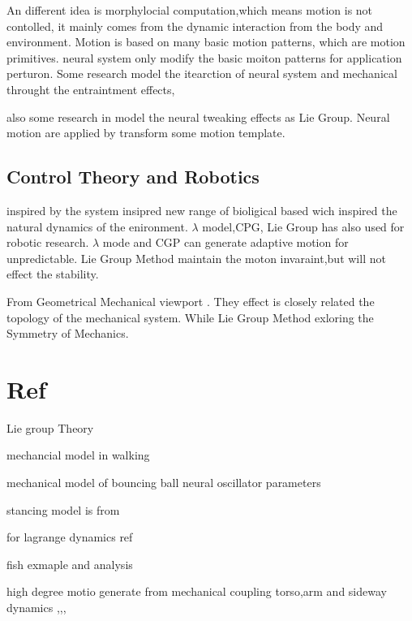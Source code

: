 An different idea is morphylocial computation\cite{nishikawa2007neuromechanics},which means motion is not contolled, it mainly comes from the dynamic interaction from the body and environment.
Motion is based on many basic motion patterns, which are motion primitives. neural system only modify the basic moiton patterns for application perturon.
Some research model the itearction of neural system and mechanical throught the entraintment effects\cite{Cohen1988}, 

also some research in model the neural tweaking effects as Lie Group.
Neural motion are applied by transform some motion template\cite{flash2007affine}.



\subsection{Control Theory and Robotics}


inspired by the system insipred new range of bioligical based wich inspired the natural dynamics of the enironment.
$\lambda$ model\cite{taga1991self},CPG\cite{Williamson1999}, 
Lie Group \cite{spong2005controlled} has also used for robotic research.
$\lambda$  mode and CGP can generate  adaptive motion for unpredictable.
Lie Group Method maintain the moton invaraint,but will not effect the stability.

From Geometrical Mechanical\cite{abraham1978foundations} viewport . 
They effect is closely related the topology of the mechanical system.
While Lie Group Method exloring the Symmetry of Mechanics\cite{marsden1999introduction}.





\section{Ref}
Lie group Theory \cite{olver1986applications}

mechancial model in walking \cite{chen2007passive}

mechanical model of bouncing ball
neural oscillator parameters 

stancing model is from\cite{stephens2009modeling}

for lagrange dynamics ref \cite{Goldstein2002}


fish exmaple and analysis\cite{ostrowski1995mechanics}\cite{melli2008hierarchy}


high degree motio generate from mechanical coupling \cite{Collins2009}
torso,arm and sideway dynamics ,\cite{grizzle2001asymptotically},\cite{chevallereau2009asymptotically},\cite{ames2007geometric}

